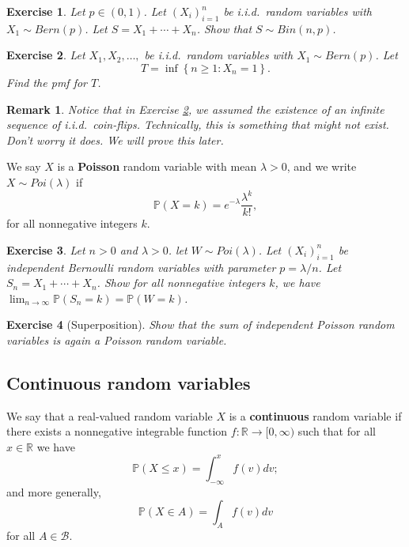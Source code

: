 \documentclass[12pt, reqno]{amsart}
\newtheorem{remark}{Remark}
\newtheorem{ex}{Exercise}[section]
\newcommand\dff[1]{\textbf{#1}}
\newcommand\ns[1]{ \left\{ {#1} \right\} }
\renewcommand{\P}{{\mathbb P}}  %
\newcommand{\R}{{\mathbb R}}
\begin{document}
\begin{ex}
	Let $p \in (0,1)$.  Let $(X_i)_{i=1} ^n$ be i.i.d.\ random variables with $X_1 \sim Bern(p)$.  Let $S= X_1 + \cdots +X_n$.  Show that $S \sim Bin(n,p)$.  
\end{ex}

\begin{ex}
	\label{geo}
	Let $X_1, X_2, \ldots, $ be i.i.d.\ random variables with $X_1 \sim Bern(p)$.  Let
	$$T = \inf\ns{n \geq 1:  X_n =1}.$$
	Find the pmf for $T$.
	
\end{ex}

\begin{remark}
	Notice that in Exercise \ref{geo}, we assumed the existence of an infinite sequence of i.i.d.\  coin-flips.  Technically, this is something that might not exist.   Don't worry it does.  We will prove this later.
\end{remark}




We say  $X$ is a \dff{Poisson} random variable with mean $\lambda >0$, and we write $X \sim Poi(\lambda)$ if 
$$\P(X = k) = e^{-\lambda} \frac{\lambda^k}{k!},$$
for all nonnegative integers $k$.  



\begin{ex}
	Let $n>0$ and $\lambda >0$.  let $W \sim Poi(\lambda)$.      Let $(X_i)_{i=1}^n$ be independent Bernoulli random variables with parameter $p=\lambda/n$.  Let $S_n = X_1 + \cdots + X_n$.  Show for all nonnegative integers $k$, we have $\lim_{n \to \infty} \P(S_n =k) = \P(W=k)$. 
\end{ex}



\begin{ex}[Superposition]
	Show that the sum of independent Poisson random variables is again a Poisson random variable.
\end{ex}



\subsection{Continuous random variables}

We say that a real-valued random variable $X$ is a \dff{continuous} random variable if there exists a nonnegative integrable function $f: \R \to [0, \infty)$ such that for all $x \in \R$ we have 
$$\P( X \leq x) = \int_{-\infty} ^x f(v) dv;$$
and more generally, 
$$\P(X \in A) = \int_A f(v)dv$$
for all $A \in \mathcal{B}$. 
 
\end{document}
